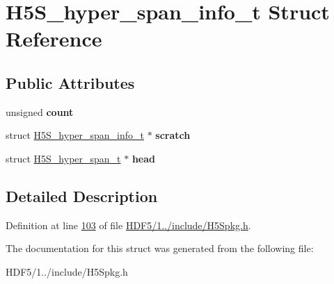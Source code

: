 \hypertarget{struct_h5_s__hyper__span__info__t}{}\section{H5\+S\+\_\+hyper\+\_\+span\+\_\+info\+\_\+t Struct Reference}
\label{struct_h5_s__hyper__span__info__t}
\subsection*{Public Attributes}
\begin{DoxyCompactItemize}
\item 
\mbox{\label{struct_h5_s__hyper__span__info__t_aa3deb640d576087dd3e884fadf7998a7}} 
unsigned {\bfseries count}
\item 
\mbox{\label{struct_h5_s__hyper__span__info__t_ad6d657456a859d06c8c7cf9b0c418cc3}} 
struct \hyperlink{struct_h5_s__hyper__span__info__t}{H5\+S\+\_\+hyper\+\_\+span\+\_\+info\+\_\+t} $\ast$ {\bfseries scratch}
\item 
\mbox{\label{struct_h5_s__hyper__span__info__t_a58e7c44313c2eb328f61ec66844f696f}} 
struct \hyperlink{struct_h5_s__hyper__span__t}{H5\+S\+\_\+hyper\+\_\+span\+\_\+t} $\ast$ {\bfseries head}
\end{DoxyCompactItemize}


\subsection{Detailed Description}


Definition at line \hyperlink{_h_d_f5_21_810_81_2include_2_h5_spkg_8h_source_l00103}{103} of file \hyperlink{_h_d_f5_21_810_81_2include_2_h5_spkg_8h_source}{H\+D\+F5/1../include/\+H5\+Spkg.\+h}.



The documentation for this struct was generated from the following file\+:\begin{DoxyCompactItemize}
\item 
H\+D\+F5/1../include/\+H5\+Spkg.\+h\end{DoxyCompactItemize}
